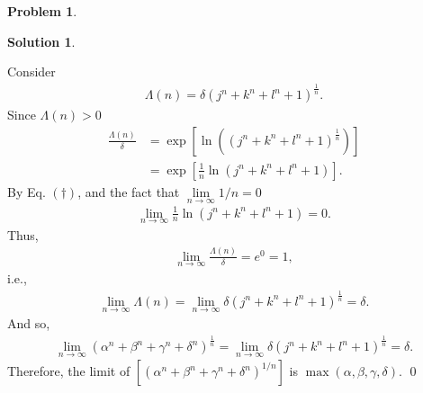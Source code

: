 \documentclass{article}
\theoremstyle{definition}
\newtheorem*{prob*}{Problem}
\newtheorem*{sln*}{Solution}
\begin{document}
\begin{prob*}
\begin{sln*}
\begin{enumerate}
\begin{enumerate}
				Consider 
				\begin{align*}
				\Lambda(n) = \delta \left(j^n + k^n + l^n + 1\right)^{\frac{1}{n}}.
				\end{align*}
				Since $\Lambda(n) > 0$
				\begin{align*}
				\frac{\Lambda(n)}{\delta}&= \exp\left[\ln\left( \left(j^n + k^n + l^n + 1\right)^{\frac{1}{n}}   \right)\right]\\
				&= \exp\left[\frac{1}{n}\ln(j^n + k^n + l^n + 1)\right].
				\end{align*}
				By Eq. $(\dagger)$, and the fact that $\lim\limits_{n\to\infty}1/n = 0$
				\begin{align*}
				\lim\limits_{n\to\infty} \frac{1}{n}\ln \left(j^n + k^n + l^n + 1\right)  = 0.
				\end{align*}
				Thus,
				\begin{align*}
				\lim\limits_{n\to\infty}\frac{\Lambda(n)}{\delta} = e^0 = 1,
				\end{align*}
				i.e.,
				\begin{align*}
				\lim\limits_{n\to\infty}\Lambda(n) = \lim\limits_{n\to\infty} \delta \left(j^n + k^n + l^n + 1\right)^{\frac{1}{n}} = \delta.
				\end{align*}
				And so,
				\begin{align*}
				\lim\limits_{n\to\infty}(\alpha^n + \beta^n + \gamma^n + \delta^n)^{\frac{1}{n}} = \lim\limits_{n\to\infty} \delta \left(j^n + k^n + l^n + 1\right)^{\frac{1}{n}} = \delta.
				\end{align*}
				Therefore, the limit of $[(\alpha^n + \beta^n + \gamma^n + \delta^n)^{1/n}]$ is $\max(\alpha,\beta,\gamma,\delta)$. \qed
				
				
				

				
				

\end{enumerate}
\end{enumerate}
\end{sln*}
\end{prob*}
\end{document}
